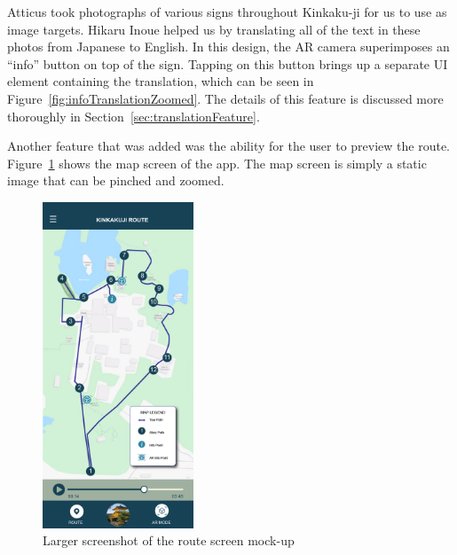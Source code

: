 \documentclass[a4paper, 10pt, american, titlepage]{article}
\begin{document}
Atticus took photographs of various signs throughout
Kinkaku-ji for us to use as image targets. Hikaru Inoue helped us by translating
all of the text in these photos from Japanese to English. In this design, the AR
camera superimposes an ``info'' button on top of the sign. Tapping on this
button brings up a separate UI element containing the translation, which can be
seen in Figure~\ref{fig:infoTranslationZoomed}. The details of this feature is
discussed more thoroughly in Section~\ref{sec:translationFeature}.

Another feature that was added was the ability for the user to preview the
route. Figure~\ref{fig:mapZoomed} shows the map screen of the app. The map
screen is simply a static image that can be pinched and zoomed.

\begin{figure}[h] \centering
    \includegraphics[width=0.4\textwidth]{map-zoomed.png}
    \caption{Larger screenshot of the route screen mock-up}
    \label{fig:mapZoomed}
\end{figure}
\end{document}

